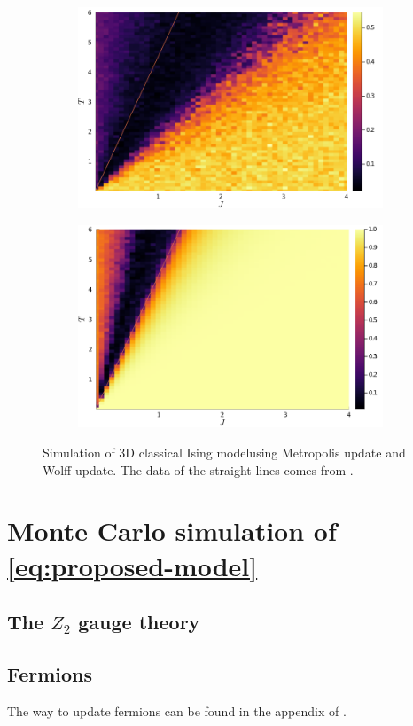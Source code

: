 \documentclass[hyperref, a4paper]{article}
\newcommand*{\Ztwo}{$\mathbb{Z}_2$ }
\newcommand*{\cim}{classical Ising model}
\def\mathbb#1{#1}%
\begin{document}
\begin{figure}
\begin{subfigure}{0.45\textwidth}
        \includegraphics[width=\textwidth]{../3d-ising-prototype/examples/isotropic/magnetization-wolff-random-init.PNG}
    \end{subfigure}
    \begin{subfigure}{0.45\textwidth}
        \includegraphics[width=\textwidth]{../3d-ising-prototype/examples/isotropic/magnetization-wolff-ones-init.PNG}
    \end{subfigure}
    \caption{Simulation of 3D \cim using Metropolis update and Wolff update. The data of the straight lines comes from \cite{Talapov_1996}.}
    \label{fig:3d-cim-benchmark}
\end{figure}

\section{Monte Carlo simulation of \eqref{eq:proposed-model}}

\subsection{The \Ztwo gauge theory}


\subsection{Fermions}

The way to update fermions can be found in the appendix of \cite{Chen_2021}.


 
\end{document}
